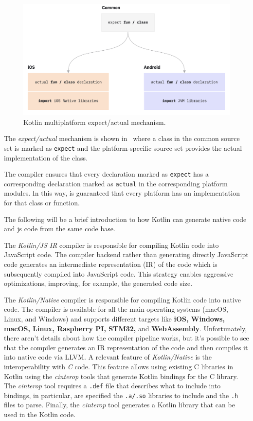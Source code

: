 \begin{figure}
	\centering
	\includegraphics[width=\linewidth]{figures/expect-actual.png}
	\caption{Kotlin multiplatform expect/actual mechanism.}
	\label{fig:kotlin-multiplatform-expected-actual}
\end{figure}

The \emph{expect/actual} mechanism is shown in~ where a class in the common source set is marked as
\texttt{expect} and the platform-specific source set provides the actual implementation of the class.

The compiler ensures that every declaration marked as \texttt{expect} has a corresponding declaration marked as \texttt{actual} in the corresponding
platform modules. In this way, is guaranteed that every platform has an implementation for that class or function.

The following will be a brief introduction to how Kotlin can generate native code and js code from the same code base.

The \emph{Kotlin/JS IR} compiler is responsible for compiling Kotlin code into JavaScript code. The compiler backend rather than generating directly
JavaScript code generates an intermediate representation (IR) of the code which is subsequently compiled into JavaScript code.
This strategy enables aggressive optimizations, improving, for example, the generated code size.

The \emph{Kotlin/Native} compiler is responsible for compiling Kotlin code into native code. The compiler is available for all the main operating
systems (macOS, Linux, and Windows) and supports different targets like \textbf{iOS, Windows, macOS, Linux, Raspberry PI, STM32,} and
\textbf{WebAssembly}. Unfortunately, there aren't details about how the compiler pipeline works, but it's possible to see that the compiler generates
an IR representation of the code and then compiles it into native code via LLVM.
A relevant feature of \emph{Kotlin/Native} is the interoperability with \emph{C} code. This feature allows using existing C libraries in Kotlin using
the \emph{cinterop} tools that generate Kotlin bindings for the C library. The \emph{cinterop} tool requires a \texttt{.def} file that describes what
to include into bindings, in particular, are specified the \texttt{.a/.so} libraries to include and the \texttt{.h} files to parse. Finally, the
\emph{cinterop} tool generates a Kotlin library that can be used in the Kotlin code.

